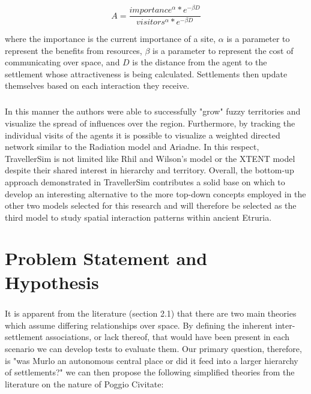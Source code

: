 \documentclass[12pt,a4paper]{thesis}
\begin{document}
		\begin{equation}
	 	A = \frac{importance^{\alpha} * e^{-\beta D}}{visitors^{\alpha} * e^{-\beta D}}
		\label{eq:attractiveness}
		\end{equation}
	
where the importance is the current importance of a site, $\alpha$ is a parameter to represent the benefits from resources, $\beta$ is a parameter to represent the cost of communicating over space, and $D$ is the distance from the agent to the settlement whose attractiveness is being calculated. Settlements then update themselves based on each interaction they receive. 

\paragraph{}
In this manner the authors were able to successfully "grow" fuzzy territories and visualize the spread of influences over the region. Furthermore, by tracking the individual visits of the agents it is possible to visualize a weighted directed network similar to the Radiation model and Ariadne. In this respect, TravellerSim is not limited like Rhil and Wilson's model or the XTENT model despite their shared interest in hierarchy and territory. Overall, the bottom-up approach demonstrated in TravellerSim contributes a solid base on which to develop an interesting alternative to the more top-down concepts employed in the other two models selected for this research and will therefore be selected as the third model to study spatial interaction patterns within ancient Etruria. 

\chapter{Problem Statement and Hypothesis}

\paragraph{}
It is apparent from the literature (section 2.1) that there are two main theories which assume differing relationships over space. By defining the inherent inter-settlement associations, or lack thereof, that would have been present in each scenario we can develop tests to evaluate them. Our primary question, therefore, is "was Murlo an autonomous central place or did it feed into a larger hierarchy of settlements?"  we can then propose the following simplified theories from the literature on the nature of Poggio Civitate:
	
\end{document}
